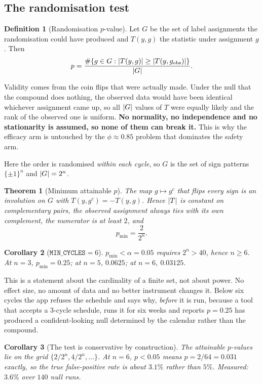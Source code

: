 \documentclass{article}
\theoremstyle{plain}
\newtheorem{theorem}{Theorem}[section]
\newtheorem{corollary}[theorem]{Corollary}
\theoremstyle{definition}
\newtheorem{definition}{Definition}[section]
\theoremstyle{remark}
\numberwithin{equation}{section}
\begin{document}
\subsection{The randomisation test}

\begin{definition}[Randomisation $p$-value]
Let $G$ be the set of label assignments the randomisation could have produced
and $T(y,g)$ the statistic under assignment $g$. Then
\[
  p = \frac{\#\{g \in G : \abs{T(y,g)} \ge \abs{T(y,g_{\mathrm{obs}})}\}}{\abs{G}} .
\]
\end{definition}

Validity comes from the coin flips that were actually made. Under the null that
the compound does nothing, the observed data would have been identical
whichever assignment came up, so all $\abs{G}$ values of $T$ were equally
likely and the rank of the observed one is uniform. \textbf{No normality, no
independence and no stationarity is assumed, so none of them can break it.}
This is why the efficacy arm is untouched by the $\phi \approx 0.85$ problem
that dominates the safety arm.

Here the order is randomised \emph{within each cycle}, so $G$ is the set of
sign patterns $\{\pm 1\}^n$ and $\abs{G} = 2^n$.

\begin{theorem}[Minimum attainable $p$]
\label{thm:pmin}
The map $g \mapsto g^c$ that flips every sign is an involution on $G$ with
$T(y,g^c) = -T(y,g)$. Hence $\abs{T}$ is constant on complementary pairs, the
observed assignment always ties with its own complement, the numerator is at
least $2$, and
\[
  p_{\min} = \frac{2}{2^n}.
\]
\end{theorem}

\begin{corollary}[$\texttt{MIN\_CYCLES} = 6$]
$p_{\min} < \alpha = 0.05$ requires $2^n > 40$, hence $n \ge 6$. At $n=3$,
$p_{\min} = 0.25$; at $n=5$, $0.0625$; at $n=6$, $0.03125$.
\end{corollary}

This is a statement about the cardinality of a finite set, not about power. No
effect size, no amount of data and no better instrument changes it. Below six
cycles the app refuses the schedule and says why, \emph{before} it is run,
because a tool that accepts a 3-cycle schedule, runs it for six weeks and
reports $p = 0.25$ has produced a confident-looking null determined by the
calendar rather than the compound.

\begin{corollary}[The test is conservative by construction]
\label{cor:conservative}
The attainable $p$-values lie on the grid $\{2/2^n, 4/2^n, \dots\}$. At $n=6$,
$p < 0.05$ means $p = 2/64 = 0.031$ exactly, so the true false-positive rate is
about $3.1\%$ rather than $5\%$. Measured: $3.6\%$ over $140$ null runs.
\end{corollary}
\end{document}
